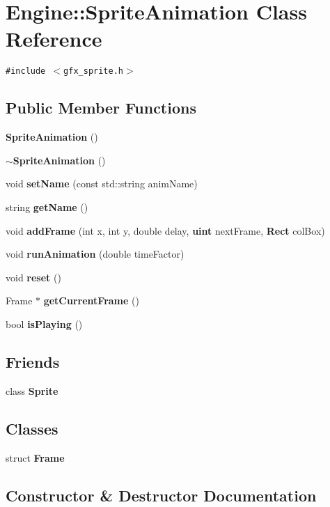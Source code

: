 \section{Engine::SpriteAnimation Class Reference}
\label{classEngine_1_1SpriteAnimation}
{\tt \#include $<$gfx\_\-sprite.h$>$}

\subsection*{Public Member Functions}
\begin{CompactItemize}
\item 
{\bf SpriteAnimation} ()
\item 
{\bf $\sim$SpriteAnimation} ()
\item 
void {\bf setName} (const std::string animName)
\item 
string {\bf getName} ()
\item 
void {\bf addFrame} (int x, int y, double delay, {\bf uint} nextFrame, {\bf Rect} colBox)
\item 
void {\bf runAnimation} (double timeFactor)
\item 
void {\bf reset} ()
\item 
Frame $\ast$ {\bf getCurrentFrame} ()
\item 
bool {\bf isPlaying} ()
\end{CompactItemize}
\subsection*{Friends}
\begin{CompactItemize}
\item 
class {\bf Sprite}
\end{CompactItemize}
\subsection*{Classes}
\begin{CompactItemize}
\item 
struct \textbf{Frame}
\end{CompactItemize}


\subsection{Constructor \& Destructor Documentation}
